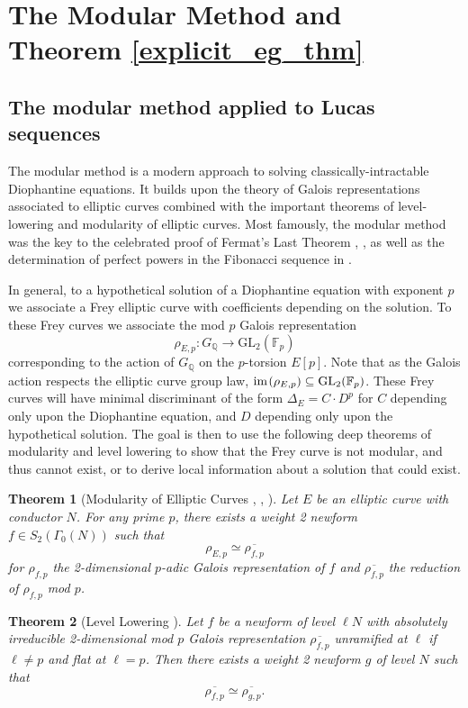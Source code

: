 \documentclass[12pt]{amsart}
\newtheorem{thm}{Theorem}[section]
\theoremstyle{definition}
\def\F{{\mathbb F}}
\def\Q{{\mathbb Q}}
\newcommand{\im}{\text{im} \hspace{0.1em} }
\newcommand{\GL}{\text{GL}}
\renewcommand{\bar}{\overline}
\begin{document}
\section{The Modular Method and Theorem \ref{explicit_eg_thm}}\label{mod_method}

\subsection{The modular method applied to Lucas sequences}

The modular method is a modern approach to solving classically-intractable Diophantine equations.  It builds upon the theory of Galois representations associated to elliptic curves combined with the important theorems of level-lowering and modularity of elliptic curves.  Most famously, the modular method was the key to the celebrated proof of Fermat's Last Theorem \cite{wiles95}, \cite{taylorwiles95}, as well as the determination of perfect powers in the Fibonacci sequence in \cite{siksek06}.

In general, to a hypothetical solution of a Diophantine equation with exponent $p$ we associate a Frey elliptic curve with coefficients depending on the solution.  To these Frey curves we associate the mod $p$ Galois representation
\[ \rho_{E,p} \colon G_{\Q} \rightarrow \GL_2(\F_p) \]
corresponding to the action of $G_\Q$ on the $p$-torsion $E[p]$.  Note that as the Galois action respects the elliptic curve group law, $\im(\rho_{E,p}) \subseteq \GL_2(\F_p)$. These Frey curves will have minimal discriminant of the form $\Delta_E = C \cdot D^p$ for $C$ depending only upon the Diophantine equation, and $D$ depending only upon the hypothetical solution.  The goal is then to use the following deep theorems of modularity and level lowering to show that the Frey curve is not modular, and thus cannot exist, or to derive local information about a solution that could exist. 

\begin{thm}[Modularity of Elliptic Curves \cite{wiles95}, \cite{taylorwiles95}, \cite{conrad01}]\label{modularity}
Let $E$ be an elliptic curve with conductor $N$.  For any prime $p$, there exists a weight 2 newform $f \in S_2(\Gamma_0(N))$ such that
\[ \rho_{E,p} \simeq \bar{\rho_{f,p}} \]
for $\rho_{f,p}$ the 2-dimensional $p$-adic Galois representation of $f$ and $\bar{\rho_{f,p}}$ the reduction of $\rho_{f,p}$ mod $p$.
\end{thm}

\begin{thm}[Level Lowering \cite{ribet91}]\label{levellow}
Let $f$ be a newform of level $\ell N$ with absolutely irreducible 2-dimensional mod $p$ Galois representation $\bar{\rho_{f,p}}$ unramified at $\ell$ if $\ell \neq p$ and flat at $\ell = p$.  Then there exists a weight 2 newform $g$ of level $N$ such that
\[ \bar{\rho_{f,p}} \simeq \bar{\rho_{g,p}}. \]
\end{thm}
\end{document}
